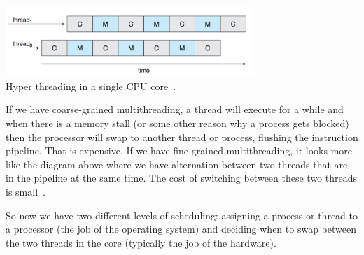 \begin{center}
	\includegraphics[width=0.7\textwidth]{images/hyperthreading.png}\\
	Hyper threading in a single CPU core~\cite{osc}.
\end{center}

If we have coarse-grained multithreading, a thread will execute for a while and when there is a memory stall (or some other reason why a process gets blocked) then the processor will swap to another thread or process, flushing the instruction pipeline. That is expensive. If we have fine-grained multithreading, it looks more like the diagram above where we have alternation between two threads that are in the pipeline at the same time. The cost of switching between these two threads is small~\cite{osc}.

So now we have two different levels of scheduling: assigning a process or thread to a processor (the job of the operating system) and deciding when to swap between the two threads in the core (typically the job of the hardware). 






